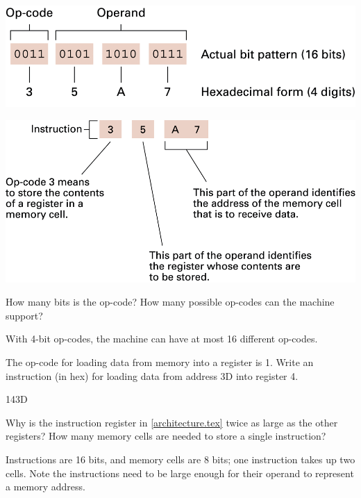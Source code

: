 

\begin{multicols}{2}
\includegraphics[width=\linewidth]{opcode1.png}

\columnbreak

\includegraphics[width=\linewidth]{opcode2.png}
\end{multicols}




\Q How many bits is the op-code? How many possible op-codes can the machine support?

\begin{answer}
With 4-bit op-codes, the machine can have at most 16 different op-codes.
\end{answer}


\Q The op-code for loading data from memory into a register is 1.
Write an instruction (in hex) for loading data from address 3D into register 4.

\begin{answer}
143D
\end{answer}


\Q Why is the instruction register in \ref{architecture.tex} twice as large as the other registers?
How many memory cells are needed to store a single instruction?

\begin{answer}
Instructions are 16 bits, and memory cells are 8 bits; one instruction takes up two cells.
Note the instructions need to be large enough for their operand to represent a memory address.
\end{answer}
